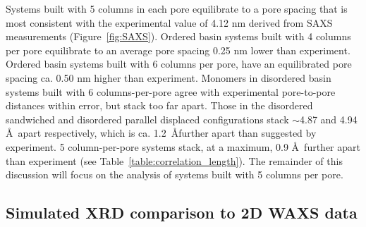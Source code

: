 \documentclass[journal=jpcbfk,manuscript=article]{achemso}
\begin{document}
  Systems built with 5 columns in each pore equilibrate to a pore spacing that
  is most consistent with the experimental value of 4.12 nm derived from SAXS
  measurements (Figure~\ref{fig:SAXS}). Ordered basin systems built with 4
  columns per pore equilibrate to an average pore spacing 0.25 nm lower than
  experiment. Ordered basin systems built with 6 columns per pore, have an
  equilibrated pore spacing ca. 0.50 nm higher than experiment.  Monomers in
  disordered basin systems built with 6 columns-per-pore agree with experimental
  pore-to-pore distances within error, but stack too far apart. Those in the
  disordered sandwiched and disordered parallel displaced configurations stack
  $\sim$4.87 and 4.94 \AA~apart respectively, which is ca. 1.2~\AA further apart
  than suggested by experiment. 5 column-per-pore systems stack, at a maximum,
  0.9 \AA~further apart than experiment (see 
  Table~\ref{table:correlation_length}).  The remainder of this discussion will
  focus on the analysis of systems built with 5 columns per pore. 


  
  \subsection{Simulated XRD comparison to 2D WAXS data}
  
\end{document}
